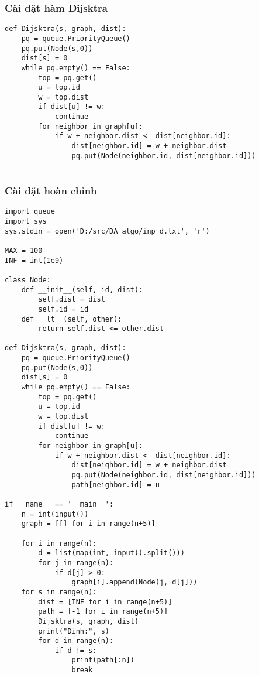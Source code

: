 \documentclass[a4paper]{article}
\begin{document}
\subsubsection{Cài đặt hàm Dijsktra}
\begin{mdframed}[hidealllines=true,backgroundcolor=magenta!10]
		\begin{lstlisting}
def Dijsktra(s, graph, dist):
    pq = queue.PriorityQueue()
    pq.put(Node(s,0))
    dist[s] = 0
    while pq.empty() == False:
        top = pq.get()
        u = top.id
        w = top.dist
        if dist[u] != w:
            continue
        for neighbor in graph[u]:
            if w + neighbor.dist <  dist[neighbor.id]:
                dist[neighbor.id] = w + neighbor.dist
                pq.put(Node(neighbor.id, dist[neighbor.id]))
                
		\end{lstlisting}
	\end{mdframed}
\subsubsection{Cài đặt hoàn chỉnh}
\begin{mdframed}[hidealllines=true,backgroundcolor=magenta!10]
		\begin{lstlisting}
import queue
import sys
sys.stdin = open('D:/src/DA_algo/inp_d.txt', 'r')

MAX = 100
INF = int(1e9)

class Node:
    def __init__(self, id, dist):
        self.dist = dist
        self.id = id
    def __lt__(self, other):
        return self.dist <= other.dist

def Dijsktra(s, graph, dist):
    pq = queue.PriorityQueue()
    pq.put(Node(s,0))
    dist[s] = 0
    while pq.empty() == False:
        top = pq.get()
        u = top.id
        w = top.dist
        if dist[u] != w:
            continue
        for neighbor in graph[u]:
            if w + neighbor.dist <  dist[neighbor.id]:
                dist[neighbor.id] = w + neighbor.dist
                pq.put(Node(neighbor.id, dist[neighbor.id]))
                path[neighbor.id] = u

if __name__ == '__main__':
    n = int(input())
    graph = [[] for i in range(n+5)]
    
    for i in range(n):
        d = list(map(int, input().split()))
        for j in range(n):
            if d[j] > 0:
                graph[i].append(Node(j, d[j]))
    for s in range(n):
        dist = [INF for i in range(n+5)]
        path = [-1 for i in range(n+5)]
        Dijsktra(s, graph, dist)
        print("Dinh:", s)
        for d in range(n):
            if d != s:
                print(path[:n])
                break

		\end{lstlisting}
	\end{mdframed}
\end{document}
